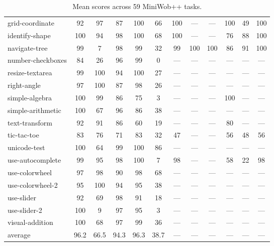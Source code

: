 \begin{table}[t!]
{\begin{tabular}{lccccccccccc}
grid-coordinate & 92 & 97 & 87 & 100 & 66 & 100 & --- & --- & 100 & 49 & 100 \\
identify-shape & 100 & 94 & 98 & 100 & 68 & 100 & --- & --- & 76 & 88 & 100 \\
navigate-tree & 99 & 7 & 98 & 99 & 32 & 99 & 100 & 100 & 86 & 91 & 100 \\
number-checkboxes & 84 & 26 & 96 & 99 & 0 & --- & --- & --- & --- & --- & --- \\
resize-textarea & 99 & 100 & 94 & 100 & 27 & --- & --- & --- & --- & --- & --- \\
right-angle & 97 & 100 & 87 & 98 & 26 & --- & --- & --- & --- & --- & --- \\
simple-algebra & 100 & 99 & 86 & 75 & 3 & --- & --- & --- & 100 & --- & --- \\
simple-arithmetic & 100 & 67 & 96 & 86 & 38 & --- & --- & --- & --- & --- & --- \\
text-transform & 92 & 91 & 86 & 60 & 19 & --- & --- & --- & 80 & --- & --- \\
tic-tac-toe & 83 & 76 & 71 & 83 & 32 & 47 & --- & --- & 56 & 48 & 56 \\
unicode-test & 100 & 64 & 99 & 100 & 86 & --- & --- & --- & --- & --- & --- \\
use-autocomplete & 99 & 95 & 98 & 100 & 7 & 98 & --- & --- & 58 & 22 & 98 \\
use-colorwheel & 97 & 98 & 90 & 98 & 68 & --- & --- & --- & --- & --- & --- \\
use-colorwheel-2 & 95 & 100 & 94 & 95 & 38 & --- & --- & --- & --- & --- & --- \\
use-slider & 92 & 69 & 98 & 91 & 18 & --- & --- & --- & --- & --- & --- \\
use-slider-2 & 100 & 9 & 97 & 95 & 3 & --- & --- & --- & --- & --- & --- \\
visual-addition & 100 & 68 & 97 & 99 & 36 & --- & --- & --- & --- & --- & --- \\
\midrule
average & 96.2 & 66.5 & 94.3 & 96.3 & 38.7 & --- & --- & --- & --- & --- & --- \\
\bottomrule


\end{tabular}
}
\vspace{0.04 in}
\caption{Mean scores across 59 MiniWob++ tasks.}
\label{tab:miniwob-per-task}
\end{table}